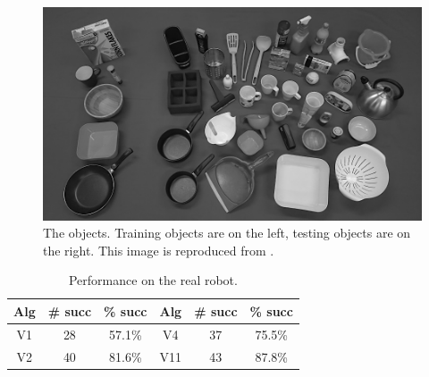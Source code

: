 
\begin{figure}[t]
\begin{center}
  \includegraphics[width=0.7\linewidth]{images/objects.jpg}
  \end{center}
  \caption{The objects. Training objects are on the left, testing objects are on the right. This image is reproduced from \protect\cite{kopicki2019ijrr}.}
  \label{fig:real-objects}
\end{figure}

\begin{table}[b]
\small
\begin{center}
\caption{Performance on the real robot. \label{tab:robot-results}}
\begin{tabular}{|c|c|c|c|c|c|} \hline
Alg & \# succ & \% succ & Alg & \# succ & \% succ \\ \hline
V1  &  28 & 57.1\% & V4   & 37  & 75.5\% \\
V2  & 40 & 81.6\% & V11 & 43  & 87.8\% \\
\hline
\end{tabular}
\end{center}
\end{table}

